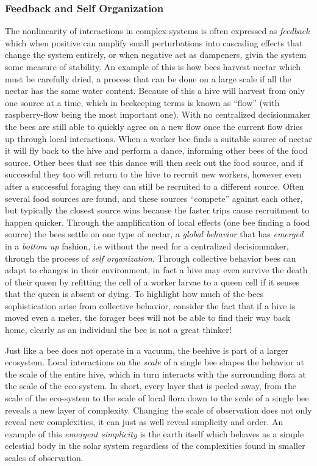 \subsubsection{Feedback and Self Organization}
The nonlinearity of interactions in complex systems is often expressed as
\emph{feedback} which when positive can amplify small perturbations into
cascading effects that change the system entirely, or when negative act as
dampeners, givin the system some measure of stability.
An example of this is how bees harvest nectar which must be carefully dried, a
process that can be done on a large scale if all the nectar has the same water
content.
Because of this a hive will harvest from only one source at a time, which in
beekeeping terms is known as ``flow'' (with raspberry-flow being the most
important one).
With no centralized decisionmaker the bees are still able to quickly agree on a
new flow once the current flow dries up through local interactions.
When a worker bee finds a suitable source of nectar it will fly back to the hive
and perform a dance, informing other bees of the food source.
Other bees that see this dance will then seek out the food source, and if
successful they too will return to the hive to recruit new workers, however even
after a successful foraging they can still be recruited to a different source.
Often several food sources are found, and these sources ``compete'' against each
other, but typically the closest source wins because the faster trips cause
recruitment to happen quicker.
Through the amplification of local effects (one bee finding a food source) the
bees settle on one type of nectar, a \emph{global behavior} that has
\emph{emerged} in a \emph{bottom up} fashion, i.e without the need for
a centralized decisionmaker, through the process of \emph{self organization}.
Through collective behavior bees can adapt to changes in their environment, in
fact a hive may even survive the death of their queen by refitting the cell of a
worker larvae to a queen cell if it senses that the queen is absent or dying.
To highlight how much of the bees sophistication arise from collective behavior,
consider the fact that if a hive is moved even a meter, the forager bees will
not be able to find their way back home, clearly as an individual the bee is not
a great thinker!
\par
%
Just like a bee does not operate in a vacuum, the beehive is part of a larger
ecosystem.
Local interactions on the \emph{scale} of a single bee shapes the behavior at
the scale of the entire hive, which in turn interacts with the surrounding flora
at the scale of the eco-system.
In short, every layer that is peeled away, from the scale of the eco-system to
the scale of local flora down to the scale of a single bee reveals a new layer
of complexity.
Changing the scale of observation does not only reveal new complexities, it can
just as well reveal simplicity and order.
An example of this \emph{emergent simplicity} is the earth itself which behaves
as a simple celestial body in the solar system regardless of the complexities
found in smaller scales of observation.
%
